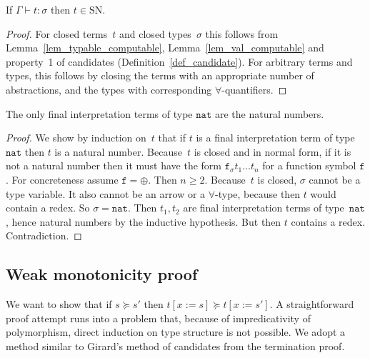 \documentclass[a4paper,UKenglish,cleveref,autoref,numberwithinsect]{lipics-v2019}
\theoremstyle{definition}
\newcommand{\subst}[2]{#1:=#2}
\newcommand{\nat}{\mathtt{nat}}
\newcommand{\SN}{\mathrm{SN}}
\newcommand{\proves}{\vdash}
\begin{document}
{ \renewcommand{\thetheorem}{\ref{thm_sn}}
\begin{theorem}
  If $\Gamma \proves t : \sigma$ then $t \in \SN$.
\end{theorem}
\addtocounter{theorem}{-1}}

\begin{proof}
  For closed terms~$t$ and closed types~$\sigma$ this follows from
  Lemma~\ref{lem_typable_computable}, Lemma~\ref{lem_val_computable}
  and property~1 of candidates (Definition~\ref{def_candidate}). For
  arbitrary terms and types, this follows by closing the terms with an
  appropriate number of abstractions, and the types with corresponding
  $\forall$-quantifiers.
\end{proof}

{ \renewcommand{\thelemma}{\ref{lem_final_nat}}
\begin{lemma}
  The only final interpretation terms of type $\nat$ are the natural
  numbers.
\end{lemma}
\addtocounter{theorem}{-1}}

\begin{proof}
  We show by induction on~$t$ that if $t$ is a final interpretation
  term of type~$\nat$ then $t$ is a natural number. Because~$t$ is
  closed and in normal form, if it is not a natural number then it
  must have the form $\mathtt{f}_\sigma t_1 \ldots t_n$ for a function
  symbol $\mathtt{f}$. For concreteness assume $\mathtt{f} =
  \oplus$. Then $n \ge 2$. Because~$t$ is closed, $\sigma$ cannot be a
  type variable. It also cannot be an arrow or a $\forall$-type,
  because then $t$ would contain a redex. So $\sigma=\nat$. Then
  $t_1,t_2$ are final interpretation terms of type~$\nat$, hence
  natural numbers by the inductive hypothesis. But then $t$ contains a
  redex. Contradiction.
\end{proof}

\subsection{Weak monotonicity proof}\label{sec_weakly_monotone_proof}

We want to show that if $s \succeq s'$ then $t[\subst{x}{s}] \succeq
t[\subst{x}{s'}]$. A straightforward proof attempt runs into a problem
that, because of impredicativity of polymorphism, direct induction on
type structure is not possible. We adopt a method similar to Girard's
method of candidates from the termination proof.
\end{document}
